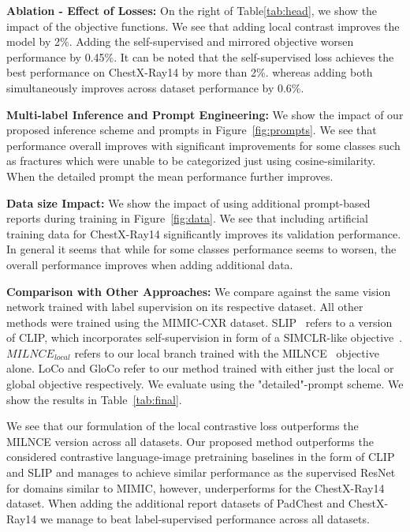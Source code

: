 \documentclass[runningheads]{llncs}
\begin{document}
 
\noindent\textbf{Ablation - Effect of Losses:}
On the right of Table\ref{tab:head}, we show the impact of the objective functions. We see that adding local contrast improves the model by 2\%. Adding the self-supervised and mirrored objective worsen performance by 0.45\%. It can be noted that the self-supervised loss achieves the best performance on ChestX-Ray14 by more than 2\%.
 whereas adding both simultaneously improves across dataset performance by 0.6\%. 

\noindent\textbf{Multi-label Inference and Prompt Engineering:} We show the impact of our proposed inference scheme and prompts in Figure~\ref{fig:prompts}. We see that performance overall improves with significant improvements for some classes such as fractures which were unable to be categorized just using cosine-similarity. When the detailed prompt the mean performance further improves.

\noindent\textbf{Data size Impact: }
 We show the impact of using additional prompt-based reports during training  in Figure~\ref{fig:data}. We see that including artificial training data for ChestX-Ray14 significantly improves its validation performance.  In general it seems that while for some classes performance seems to worsen, the overall performance improves when adding additional data.


\noindent\textbf{Comparison with Other Approaches: }
We compare against the same vision network trained with label supervision on its respective dataset. All other methods were trained using the MIMIC-CXR dataset. SLIP~\cite{mu2021slip} refers to a version of CLIP, which incorporates self-supervision in form of a SIMCLR-like objective~\cite{chen2020simple}. $MILNCE_{local}$ refers to our local branch trained with the MILNCE~\cite{miech2020end} objective alone. LoCo and GloCo refer to our method trained with either just the local or global objective respectively. We evaluate using the "detailed"-prompt scheme.  We show the results in Table~\ref{tab:final}. 

We see that our formulation of the local contrastive loss outperforms the MILNCE version across all datasets. Our proposed method outperforms the considered contrastive language-image pretraining baselines in the form of CLIP and SLIP and manages to achieve similar performance as the supervised ResNet for domains similar to MIMIC, however, underperforms for the ChestX-Ray14 dataset. When adding the additional report datasets of PadChest and ChestX-Ray14 we manage to beat label-supervised performance across all datasets.
\end{document}
